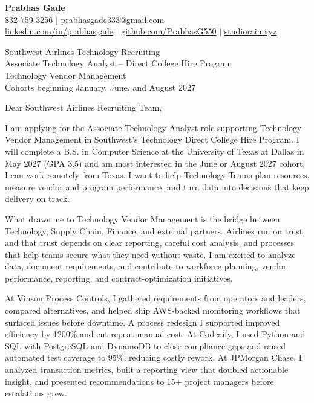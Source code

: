 \documentclass[letterpaper,11pt]{letter}
\begin{document}
\begin{flushleft}
\textbf{\large Prabhas Gade}\\
832-759-3256 $|$ \href{mailto:prabhasgade333@gmail.com}{prabhasgade333@gmail.com}\\
\href{https://linkedin.com/in/prabhasgade}{linkedin.com/in/prabhasgade} $|$
\href{https://github.com/PrabhasG550}{github.com/PrabhasG550} $|$
\href{https://studiorain.xyz}{studiorain.xyz}
\end{flushleft}

\vspace{6pt}
\begin{flushleft}
Southwest Airlines Technology Recruiting\\
Associate Technology Analyst -- Direct College Hire Program\\
Technology Vendor Management\\
Cohorts beginning January, June, and August 2027
\end{flushleft}

Dear Southwest Airlines Recruiting Team,

I am applying for the Associate Technology Analyst role supporting Technology Vendor Management in Southwest's Technology Direct College Hire Program. I will complete a B.S. in Computer Science at the University of Texas at Dallas in May 2027 (GPA 3.5) and am most interested in the June or August 2027 cohort. I can work remotely from Texas. I want to help Technology Teams plan resources, measure vendor and program performance, and turn data into decisions that keep delivery on track.

What draws me to Technology Vendor Management is the bridge between Technology, Supply Chain, Finance, and external partners. Airlines run on trust, and that trust depends on clear reporting, careful cost analysis, and processes that help teams secure what they need without waste. I am excited to analyze data, document requirements, and contribute to workforce planning, vendor performance, reporting, and contract-optimization initiatives.

At Vinson Process Controls, I gathered requirements from operators and leaders, compared alternatives, and helped ship AWS-backed monitoring workflows that surfaced issues before downtime. A process redesign I supported improved efficiency by 1200\% and cut repeat manual cost. At Codeaify, I used Python and SQL with PostgreSQL and DynamoDB to close compliance gaps and raised automated test coverage to 95\%, reducing costly rework. At JPMorgan Chase, I analyzed transaction metrics, built a reporting view that doubled actionable insight, and presented recommendations to 15+ project managers before escalations grew.
\end{document}
